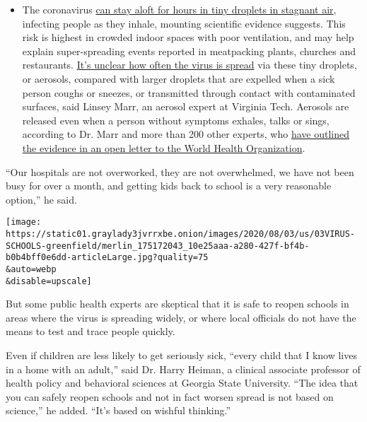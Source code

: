 \begin{itemize}
  \begin{itemize}
  \tightlist
  \item
    The coronavirus
    \href{https://www.nytimes3xbfgragh.onion/2020/07/04/health/239-experts-with-one-big-claim-the-coronavirus-is-airborne.html?action=click\&pgtype=Article\&state=default\&region=MAIN_CONTENT_3\&context=storylines_faq}{can
    stay aloft for hours in tiny droplets in stagnant air}, infecting
    people as they inhale, mounting scientific evidence suggests. This
    risk is highest in crowded indoor spaces with poor ventilation, and
    may help explain super-spreading events reported in meatpacking
    plants, churches and restaurants.
    \href{https://www.nytimes3xbfgragh.onion/2020/07/06/health/coronavirus-airborne-aerosols.html?action=click\&pgtype=Article\&state=default\&region=MAIN_CONTENT_3\&context=storylines_faq}{It's
    unclear how often the virus is spread} via these tiny droplets, or
    aerosols, compared with larger droplets that are expelled when a
    sick person coughs or sneezes, or transmitted through contact with
    contaminated surfaces, said Linsey Marr, an aerosol expert at
    Virginia Tech. Aerosols are released even when a person without
    symptoms exhales, talks or sings, according to Dr. Marr and more
    than 200 other experts, who
    \href{https://academic.oup.com/cid/article/doi/10.1093/cid/ciaa939/5867798}{have
    outlined the evidence in an open letter to the World Health
    Organization}.
  \end{itemize}
\end{itemize}

``Our hospitals are not overworked, they are not overwhelmed, we have
not been busy for over a month, and getting kids back to school is a
very reasonable option,'' he said.

\texttt{[image: https://static01.graylady3jvrrxbe.onion/images/2020/08/03/us/03VIRUS-SCHOOLS-greenfield/merlin\_175172043\_10e25aaa-a280-427f-bf4b-b0b4bff0e6dd-articleLarge.jpg?quality=75\\\&auto=webp\\\&disable=upscale]}

But some public health experts are skeptical that it is safe to reopen
schools in areas where the virus is spreading widely, or where local
officials do not have the means to test and trace people quickly.

Even if children are less likely to get seriously sick, ``every child
that I know lives in a home with an adult,'' said Dr. Harry Heiman, a
clinical associate professor of health policy and behavioral sciences at
Georgia State University. ``The idea that you can safely reopen schools
and not in fact worsen spread is not based on science,'' he added.
``It's based on wishful thinking.''


